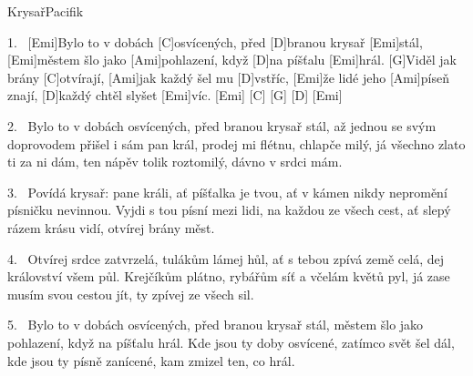 \begin{song}{Krysař}{Pacifik}

\begin{xverse}{1.~}
[Emi]Bylo to v dobách [C]osvícených, před [D]branou krysař [Emi]stál,
[Emi]městem šlo jako [Ami]pohlazení, když [D]na píšťalu [Emi]hrál.
[G]Viděl jak brány [C]otvírají, [Ami]jak každý šel mu [D]vstříc,
[Emi]{že} lidé jeho [Ami]píseň znají, [D]každý chtěl slyšet [Emi]víc.
[Emi]{ } [C]{ } [G]{ } [D]{ } [Emi]{ }
\end{xverse}


\begin{xverse}{2.~}
Bylo to v dobách osvícených, před branou krysař stál,
až jednou se svým doprovodem přišel i sám pan král,
prodej mi flétnu, chlapče milý, já všechno zlato ti za ni dám,
ten nápěv tolik roztomilý, dávno v srdci mám.
\end{xverse}


\begin{xverse}{3.~}
Povídá krysař: pane králi, ať píšťalka je tvou,
ať v kámen nikdy nepromění písničku nevinnou.
Vyjdi s tou písní mezi lidi, na každou ze všech cest,
ať slepý rázem krásu vidí, otvírej brány měst.
\end{xverse}


\begin{xverse}{4.~}
Otvírej srdce zatvrzelá, tulákům lámej hůl,
ať s tebou zpívá země celá, dej království všem půl.
Krejčíkům plátno, rybářům síť a včelám květů pyl,
já zase musím svou cestou jít, ty zpívej ze všech sil.
\end{xverse}


\begin{xverse}{5.~}
Bylo to v dobách osvícených, před branou krysař stál,
městem šlo jako pohlazení, když na píšťalu hrál.
Kde jsou ty doby osvícené, zatímco svět šel dál,
kde jsou ty písně zanícené, kam zmizel ten, co hrál.
\end{xverse}
\end{song}

